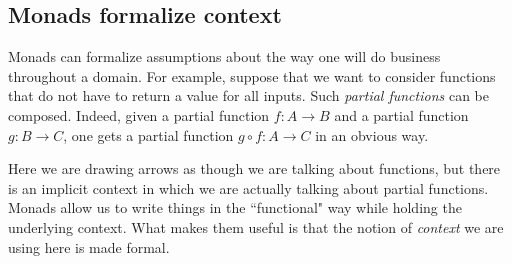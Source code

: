 \documentclass{book}
\def\to{\rightarrow}
\def\taking{\colon}
\theoremstyle{remark}
\theoremstyle{definition}
\begin{document}

\subsection{Monads formalize context}

Monads can formalize assumptions about the way one will do business throughout a domain. For example, suppose that we want to consider functions that do not have to return a value for all inputs. Such {\em partial functions} can be composed. Indeed, given a partial function $f\taking A\to B$ and a partial function $g\taking B\to C$, one gets a partial function $g\circ f\taking A\to C$ in an obvious way.

Here we are drawing arrows as though we are talking about functions, but there is an implicit context in which we are actually talking about partial functions. Monads allow us to write things in the ``functional" way while holding the underlying context. What makes them useful is that the notion of {\em context} we are using here is made formal.
\end{document}
